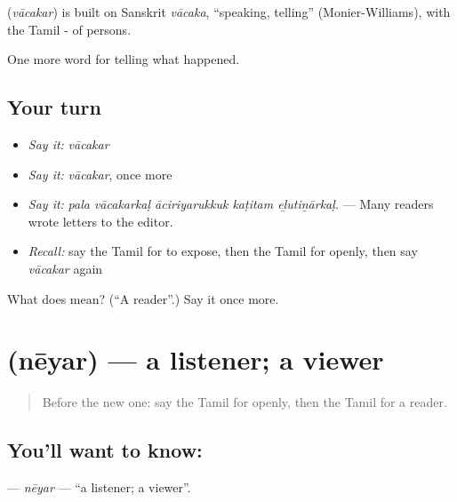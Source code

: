 \begin{cousinweb}
\textbf{} (\emph{vācakar}) is built on Sanskrit \emph{vācaka}, \textquotedblleft{}speaking, telling\textquotedblright{} (Monier-Williams), with the Tamil - of persons.
\end{cousinweb}

\begin{grammarlens}[title={What you've built}]
One more word for telling what happened.
\end{grammarlens}

\subsection*{Your turn}
\begin{itemize}
\raggedright
  \item \emph{Say it:} \emph{vācakar}
  \item \emph{Say it:} \emph{vācakar}, once more
  \item \emph{Say it:} \emph{pala vācakarkaḷ āciriyarukkuk kaṭitam eḻutiṉārkaḷ.} — Many readers wrote letters to the editor.
  \item \emph{Recall:} say the Tamil for to expose, then the Tamil for openly, then say \emph{vācakar} again
\end{itemize}

\begin{tcolorbox}[breakable,colback=teal!4,colframe=teal!35!black,title={Before you move on}]
What does  mean? (\textquotedblleft{}A reader\textquotedblright{}.) Say it once more.
\end{tcolorbox}
\section[\texorpdfstring{\ta{நேயர்} (nēyar)}{நேயர் (nēyar)}]{ (nēyar) — a listener; a viewer}

\label{lesson:TA-C309-neyar}



\begin{quote}
Before the new one: say the Tamil for openly, then the Tamil for a reader.
\end{quote}

\subsection*{You'll want to know: }
\textbf{} — \emph{nēyar} — \textquotedblleft{}a listener; a viewer\textquotedblright{}.

